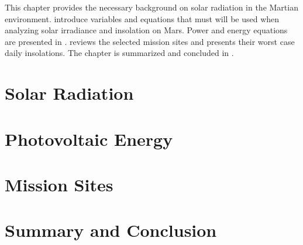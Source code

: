 This chapter provides the necessary background on solar radiation in the Martian environment.  introduce variables and equations that must will be used when analyzing solar irradiance and insolation on Mars. Power and energy equations are presented in .  reviews the selected mission sites and presents their worst case daily insolations. The chapter is summarized and concluded in .

\section{Solar Radiation}
\label{sec:MarsSolarEnergy:SolarRadiation}


\section{Photovoltaic Energy}
\label{sec:MarsSolarEnergy:PhotovoltaicEnergy}


\section{Mission Sites}
\label{sec:MarsSolarEnergy:MissionSites}


\section{Summary and Conclusion}
\label{sec:MarsSolarEnergy:SummaryAndConclusion}
